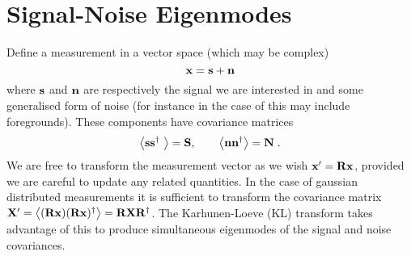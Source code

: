 \documentclass[prd,twocolumn,nofootinbib]{revtex4}
\begin{document}
\section{Signal-Noise Eigenmodes}



\noindent
Define a measurement in a vector space (which may be complex)
\begin{equation}
\mathbf{x} = \mathbf{s} + \mathbf{n}
\end{equation}
where $\mathbf{s}$ and $\mathbf{n}$ are respectively the signal we are interested in and some
generalised form of noise (for instance in the case of \tcm this may include
foregrounds). These components have covariance matrices
\begin{equation}
\left\langle \mathbf{s} \mathbf{s}^{\dagger}\ \right\rangle = \mathbf{S}, \qquad \left\langle \mathbf{n} \mathbf{n}^{\dagger} \right\rangle = \mathbf{N} \; .
\end{equation}
We are free to transform the measurement vector as we wish $\mathbf{x}' = \mathbf{R}\mathbf{x}$,
provided we are careful to update any related quantities. In the case of
gaussian distributed measurements it is sufficient to transform the covariance
matrix $\mathbf{X}' = \left\langle (\mathbf{R} \mathbf{x}) (\mathbf{R} \mathbf{x})^{\dagger} \right\rangle = \mathbf{R}
\mathbf{X}\mathbf{R}^{\dagger}$. The Karhunen-Loeve (KL) transform takes advantage of this to
produce simultaneous eigenmodes of the signal and noise covariances.
\end{document}
